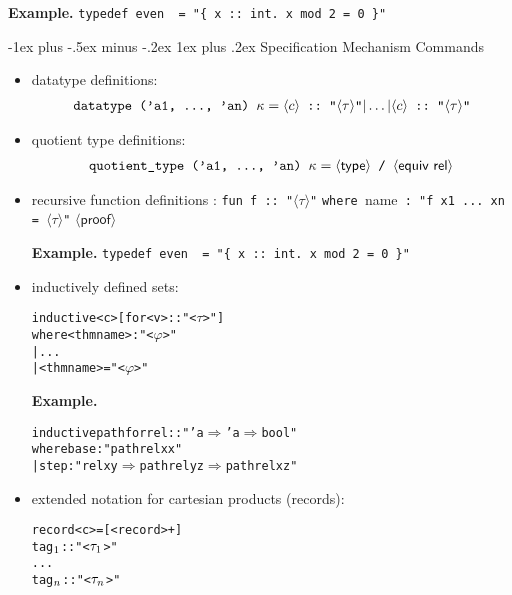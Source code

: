 \documentclass[10pt,landscape,a4paper]{article}
\makeatletter
\renewcommand{\subsubsection}{\@startsection{subsubsection}{3}{0mm}%
                                {-1ex plus -.5ex minus -.2ex}%
                                {1ex plus .2ex}%
                                {\normalfont\small\bfseries}}
\makeatother
\begin{document}
\begin{multicols}{3}
\begin{itemize}
  \textbf{Example.} \verb!typedef even  = "{ x :: int. x mod 2 = 0 }"!
\end{itemize}

\subsubsection{Specification Mechanism Commands}
\begin{itemize}
\item datatype definitions:
\begin{eqnarray*}
  \verb!datatype ('a1, ..., 'an) !\kappa = \langle c \rangle\verb! :: "! \langle \tau \rangle \verb!"! | \dots | \langle c \rangle\verb! :: "! \langle \tau \rangle \verb!"! 
\end{eqnarray*}

\item quotient type definitions:
\begin{eqnarray*}
  \verb!quotient_type ('a1, ..., 'an) !\kappa = \langle \textsf{type} \rangle \verb! / ! \langle \textsf{equiv rel} \rangle 
\end{eqnarray*}

\item recursive function definitions : \verb!fun f :: "!$\langle\tau\rangle$\verb!"!
  \verb!where !\textsf{name}\verb! : "f x1 ... xn = !$\langle\tau\rangle$\verb!"! $\langle\textsf{proof}\rangle$

  \textbf{Example.} \verb!typedef even  = "{ x :: int. x mod 2 = 0 }"!

\item inductively defined sets:
\begin{alltt}
inductive <c> [ for <v> :: "<\(\tau\)>" ]
  where <thmname> : "<\(\varphi\)>"
      | ...
      | <thmname> = "<\(\varphi\)>"
\end{alltt}

\textbf{Example.}
\begin{alltt}
inductive path for rel :: "'a \(\Rightarrow\) 'a \(\Rightarrow\) bool" 
where base : "path rel x x"
    | step : "rel x y \(\Rightarrow\) path rel y z \(\Rightarrow\) path rel x z"
\end{alltt}

\item extended notation for cartesian products (records):
\begin{alltt}
record <c> = [<record> +]
  tag\(\sb{1}\) :: "<\(\tau\sb{1}\)>"
  ...
  tag\(\sb{n}\) :: "<\(\tau\sb{n}\)>"
\end{alltt}


\end{itemize}
\end{multicols}
\end{document}
